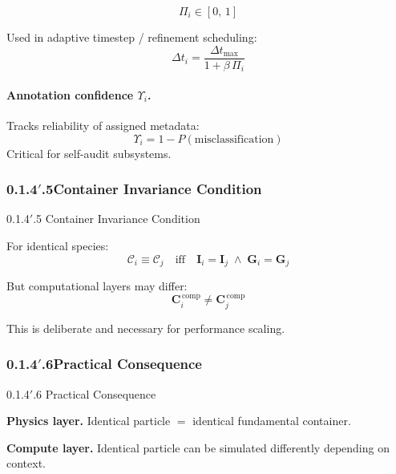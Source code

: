 \documentclass[11pt, a4paper, oneside]{article}
\theoremstyle{definition}
\theoremstyle{remark}
\newcommand{\boldI}{\mathbf{I}}
\newcommand{\boldG}{\mathbf{G}}
\newcommand{\boldC}{\mathbf{C}}
\begin{document}
\[
  \Pi_i \in [0,\,1]
\]

Used in adaptive timestep / refinement scheduling:
%
\begin{equation}
  \Delta t_i = \frac{\Delta t_{\max}}{1 + \beta\,\Pi_i}
  \label{eq:adaptive-dt}
\end{equation}

\paragraph{Annotation confidence
          \texorpdfstring{$\Upsilon_i$}{Upsilon-i}.}

Tracks reliability of assigned metadata:
\begin{equation}
  \Upsilon_i = 1 - P(\text{misclassification})
  \label{eq:annotation-confidence}
\end{equation}
Critical for self-audit subsystems.

\subsubsection*{0.1.4$'$.5\quad Container Invariance Condition}
%
  {0.1.4$'$.5 Container Invariance Condition}
\label{sec:container-invariance}

For identical species:
%
\begin{equation}
  \mathcal{C}_i \equiv \mathcal{C}_j
  \quad \text{iff} \quad
  \boldI_i = \boldI_j
  \;\land\;
  \boldG_i = \boldG_j
  \label{eq:container-invariance}
\end{equation}

But computational layers may differ:
\[
  \boldC_i^{\,\mathrm{comp}} \neq \boldC_j^{\,\mathrm{comp}}
\]

This is deliberate and necessary for performance scaling.

\subsubsection*{0.1.4$'$.6\quad Practical Consequence}
%
  {0.1.4$'$.6 Practical Consequence}
\label{sec:container-consequence}

\noindent\textbf{Physics layer.}
Identical particle $=$ identical fundamental container.

\medskip
\noindent\textbf{Compute layer.}
Identical particle can be simulated differently depending on context.
\end{document}
